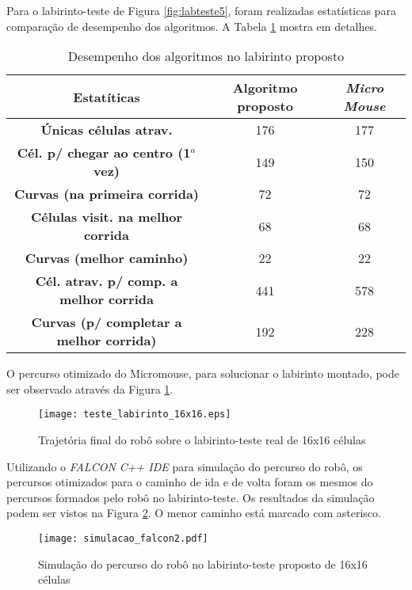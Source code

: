 Para o labirinto-teste de Figura \ref{fig:labteste5}, foram realizadas estatísticas para comparação de desempenho dos algoritmos. A Tabela \ref{tab:estatistica2} mostra em detalhes. 


\begin{table}[!htb]
	\centering
	\caption{\label{tab:estatistica2}Desempenho dos algoritmos no labirinto proposto}
\begin{tabular}{c|cc}
 \textbf{Estatíticas} & \textbf{Algoritmo proposto}  & \textbf{\emph{Micro Mouse}} \\ 
\hline 
\textbf{Únicas células atrav.} & 176 & 177 \\ 
\hline 
\textbf{Cél. p/ chegar ao centro (1$^a$ vez)} & 149 & 150\\ 
\hline 
\textbf{Curvas (na primeira corrida)} & 72 & 72\\ 
\hline 
\textbf{Células visit. na melhor corrida} & 68 &  68\\ 
\hline 
\textbf{Curvas (melhor caminho)} & 22 & 22 \\ 
\hline 
\textbf{Cél. atrav. p/ comp. a melhor corrida} & 441 & 578 \\ 
\hline 
\textbf{Curvas (p/ completar a melhor corrida)} & 192 & 228 \\ 
\end{tabular} 
	
\end{table}

O percurso otimizado do Micromouse, para solucionar o labirinto montado, pode ser observado através da Figura \ref{fig:labteste16x16}.

\begin{figure}[!htb]
	\caption{\label{fig:labteste16x16}Trajetória final do robô sobre o labirinto-teste real de 16x16 células}
	\begin{center}
		\texttt{[image: teste\_labirinto\_16x16.eps]}
	\end{center}
\end{figure}


Utilizando o \textit{FALCON C++ IDE} para simulação do percurso do robô, os percursos otimizados para o caminho de ida e de volta foram os mesmos do percursos formados pelo robô no labirinto-teste. Os resultados da simulação podem ser vistos na Figura \ref{fig:labteste6}. O menor caminho está marcado com asterisco.

\begin{figure}[!htb]
	\caption{\label{fig:labteste6}Simulação do percurso do robô no labirinto-teste proposto de 16x16 células}
	\begin{center}
		\texttt{[image: simulacao\_falcon2.pdf]}
	\end{center}
\end{figure}



